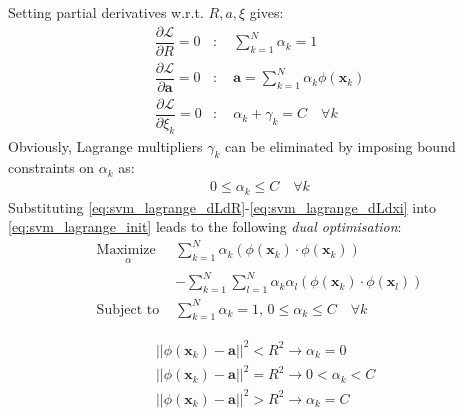 \documentclass[conference]{IEEEtran}
\theoremstyle{problemstyle}
\begin{document}
Setting partial derivatives w.r.t. $R, a, \xi$ gives:
\begin{subequations}
\begin{align}
\dfrac{\partial \mathcal{L}}{\partial R} = 0 &: \quad \sum_{k=1}^N \alpha_k = 1 \label{eq:svm_lagrange_dLdR} \\
\dfrac{\partial \mathcal{L}}{\partial \mathbf{a}} = 0 &: \quad \mathbf{a} = \sum_{k=1}^N \alpha_k \phi \left( \mathbf{x}_k \right) \label{eq:svm_lagrange_dLda} \\
\dfrac{\partial \mathcal{L}}{\partial \xi_k} = 0 &: \quad \alpha_k + \gamma_k = C \quad \forall k \label{eq:svm_lagrange_dLdxi}
\end{align}
\end{subequations}
Obviously, Lagrange multipliers $\gamma_k$ can be eliminated by imposing bound constraints on $\alpha_k$ as:
\begin{align}
0\le \alpha_k \le C \quad \forall k
\end{align}
Substituting \eqref{eq:svm_lagrange_dLdR}-\eqref{eq:svm_lagrange_dLdxi} into \eqref{eq:svm_lagrange_init} leads to the following \emph{dual optimisation}:
\begin{subequations}\label{eq:svm_dual}
\begin{align}
\underset{
	\begin{array}{c}
		 \alpha
	\end{array}}{\text{Maximize }} &\sum_{k=1}^N \alpha_k \left( \phi \left( \mathbf{x}_k \right) \cdot \phi \left( \mathbf{x}_k \right) \right) \nonumber \\&- \sum_{k=1}^N \sum_{l=1}^N \alpha_k \alpha_l \left( \phi \left( \mathbf{x}_k \right) \cdot \phi \left( \mathbf{x}_l \right) \right) \\
\text{Subject to } &\sum_{k=1}^N \alpha_k = 1 \text{, } 0 \le \alpha_k \le C \quad \forall k
\end{align}
\end{subequations}

\begin{subequations}
\begin{align}
&\left|\left| \phi \left( \mathbf{x}_k \right) - \mathbf{a} \right|\right|^2 < R^2 \to \alpha_k = 0 \\
&\left|\left| \phi \left( \mathbf{x}_k \right) - \mathbf{a} \right|\right|^2 = R^2 \to 0 < \alpha_k < C \label{eq:sv_alpha}\\
&\left|\left| \phi \left( \mathbf{x}_k \right) - \mathbf{a} \right|\right|^2 > R^2 \to \alpha_k = C
\end{align}
\end{subequations}
\end{document}
